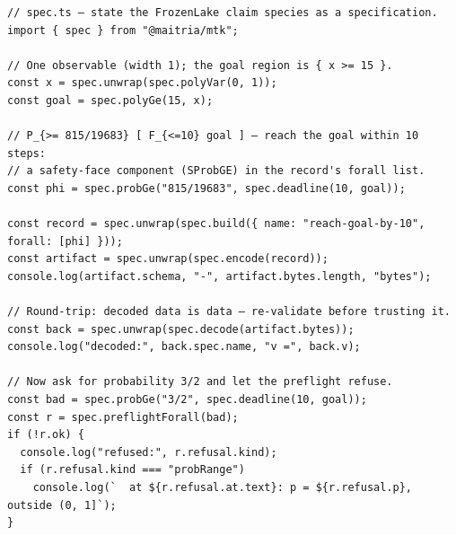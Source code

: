 \begin{Verbatim}[fontsize=\small,frame=leftline,rulecolor=\color{accentmid},framesep=3mm,xleftmargin=3mm]
// spec.ts — state the FrozenLake claim species as a specification.
import { spec } from "@maitria/mtk";

// One observable (width 1); the goal region is { x >= 15 }.
const x = spec.unwrap(spec.polyVar(0, 1));
const goal = spec.polyGe(15, x);

// P_{>= 815/19683} [ F_{<=10} goal ] — reach the goal within 10 steps:
// a safety-face component (SProbGE) in the record's forall list.
const phi = spec.probGe("815/19683", spec.deadline(10, goal));

const record = spec.unwrap(spec.build({ name: "reach-goal-by-10", forall: [phi] }));
const artifact = spec.unwrap(spec.encode(record));
console.log(artifact.schema, "-", artifact.bytes.length, "bytes");

// Round-trip: decoded data is data — re-validate before trusting it.
const back = spec.unwrap(spec.decode(artifact.bytes));
console.log("decoded:", back.spec.name, "v =", back.v);

// Now ask for probability 3/2 and let the preflight refuse.
const bad = spec.probGe("3/2", spec.deadline(10, goal));
const r = spec.preflightForall(bad);
if (!r.ok) {
  console.log("refused:", r.refusal.kind);
  if (r.refusal.kind === "probRange")
    console.log(`  at ${r.refusal.at.text}: p = ${r.refusal.p}, outside (0, 1]`);
}
\end{Verbatim}
